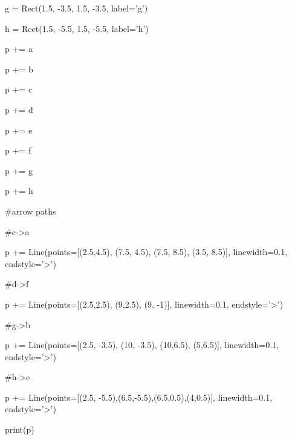 \begin{python}
g = Rect(1.5, -3.5, 1.5, -3.5, label='g')

h = Rect(1.5, -5.5, 1.5, -5.5, label='h')



p += a

p += b

p += c

p += d

p += e

p += f

p += g

p += h



#arrow paths

#c->a

p += Line(points=[(2.5,4.5), (7.5, 4.5), (7.5, 8.5), (3.5, 8.5)], linewidth=0.1, endstyle='>')

#d->f

p += Line(points=[(2.5,2.5), (9,2.5), (9, -1)], linewidth=0.1, endstyle='>')

#g->b

p += Line(points=[(2.5, -3.5), (10, -3.5), (10,6.5), (5,6.5)], linewidth=0.1, endstyle='>')

#h->e

p += Line(points=[(2.5, -5.5),(6.5,-5.5),(6.5,0.5),(4,0.5)], linewidth=0.1, endstyle='>')



print(p)

\end{python}



